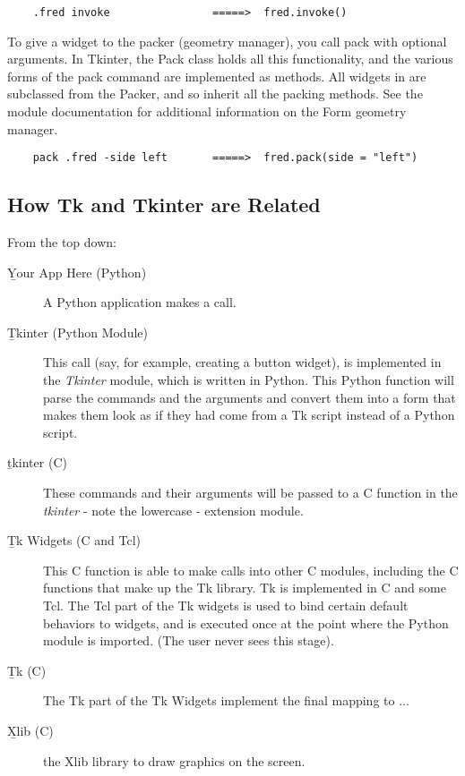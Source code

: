 \begin{verbatim}
    .fred invoke                =====>  fred.invoke()
\end{verbatim}

To give a widget to the packer (geometry manager), you call pack with
optional arguments.  In Tkinter, the Pack class holds all this
functionality, and the various forms of the pack command are
implemented as methods.  All widgets in  are
subclassed from the Packer, and so inherit all the packing
methods. See the  module documentation for additional
information on the Form geometry manager.

\begin{verbatim}
    pack .fred -side left       =====>  fred.pack(side = "left")
\end{verbatim}


\subsection{How Tk and Tkinter are Related} %


From the top down:
\begin{description}
\item[\b{Your App Here (Python)}]
A Python application makes a  call.

\item[\b{Tkinter (Python Module)}]
This call (say, for example, creating a button widget), is
implemented in the \emph{Tkinter} module, which is written in
Python.  This Python function will parse the commands and the
arguments and convert them into a form that makes them look as if they
had come from a Tk script instead of a Python script.

\item[\b{tkinter (C)}]
These commands and their arguments will be passed to a C function
in the \emph{tkinter} - note the lowercase - extension module.

\item[\b{Tk Widgets} (C and Tcl)]
This C function is able to make calls into other C modules,
including the C functions that make up the Tk library.  Tk is
implemented in C and some Tcl.  The Tcl part of the Tk widgets is used
to bind certain default behaviors to widgets, and is executed once at
the point where the Python  module is
imported. (The user never sees this stage).

\item[\b{Tk (C)}]
The Tk part of the Tk Widgets implement the final mapping to ...

\item[\b{Xlib (C)}]
the Xlib library to draw graphics on the screen.
\end{description}


